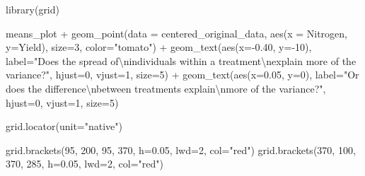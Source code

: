 \documentclass[
]{book}
\newenvironment{Shaded}{\begin{snugshade}}{\end{snugshade}}
\newcommand{\AttributeTok}[1]{\textcolor[rgb]{0.77,0.63,0.00}{#1}}
\newcommand{\DecValTok}[1]{\textcolor[rgb]{0.00,0.00,0.81}{#1}}
\newcommand{\FloatTok}[1]{\textcolor[rgb]{0.00,0.00,0.81}{#1}}
\newcommand{\FunctionTok}[1]{\textcolor[rgb]{0.00,0.00,0.00}{#1}}
\newcommand{\NormalTok}[1]{#1}
\newcommand{\SpecialCharTok}[1]{\textcolor[rgb]{0.00,0.00,0.00}{#1}}
\newcommand{\StringTok}[1]{\textcolor[rgb]{0.31,0.60,0.02}{#1}}
\begin{document}
\begin{Shaded}
\begin{Highlighting}[]
\FunctionTok{library}\NormalTok{(grid)}


\NormalTok{means\_plot }\SpecialCharTok{+} \FunctionTok{geom\_point}\NormalTok{(}\AttributeTok{data =}\NormalTok{ centered\_original\_data, }\FunctionTok{aes}\NormalTok{(}\AttributeTok{x =}\NormalTok{ Nitrogen, }\AttributeTok{y=}\NormalTok{Yield), }\AttributeTok{size=}\DecValTok{3}\NormalTok{, }\AttributeTok{color=}\StringTok{"tomato"}\NormalTok{) }\SpecialCharTok{+} 
  \FunctionTok{geom\_text}\NormalTok{(}\FunctionTok{aes}\NormalTok{(}\AttributeTok{x=}\SpecialCharTok{{-}}\FloatTok{0.40}\NormalTok{, }\AttributeTok{y=}\SpecialCharTok{{-}}\DecValTok{10}\NormalTok{), }\AttributeTok{label=}\StringTok{"Does the spread of}\SpecialCharTok{\textbackslash{}n}\StringTok{individuals within a treatment}\SpecialCharTok{\textbackslash{}n}\StringTok{explain more of the variance?"}\NormalTok{, }
            \AttributeTok{hjust=}\DecValTok{0}\NormalTok{, }\AttributeTok{vjust=}\DecValTok{1}\NormalTok{, }\AttributeTok{size=}\DecValTok{5}\NormalTok{) }\SpecialCharTok{+}
  \FunctionTok{geom\_text}\NormalTok{(}\FunctionTok{aes}\NormalTok{(}\AttributeTok{x=}\FloatTok{0.05}\NormalTok{, }\AttributeTok{y=}\DecValTok{0}\NormalTok{), }\AttributeTok{label=}\StringTok{"Or does the difference}\SpecialCharTok{\textbackslash{}n}\StringTok{between treatments explain}\SpecialCharTok{\textbackslash{}n}\StringTok{more of the variance?"}\NormalTok{, }
            \AttributeTok{hjust=}\DecValTok{0}\NormalTok{, }\AttributeTok{vjust=}\DecValTok{1}\NormalTok{, }\AttributeTok{size=}\DecValTok{5}\NormalTok{) }
  

\FunctionTok{grid.locator}\NormalTok{(}\AttributeTok{unit=}\StringTok{"native"}\NormalTok{) }

\FunctionTok{grid.brackets}\NormalTok{(}\DecValTok{95}\NormalTok{, }\DecValTok{200}\NormalTok{, }\DecValTok{95}\NormalTok{, }\DecValTok{370}\NormalTok{, }\AttributeTok{h=}\FloatTok{0.05}\NormalTok{, }\AttributeTok{lwd=}\DecValTok{2}\NormalTok{, }\AttributeTok{col=}\StringTok{"red"}\NormalTok{)}
\FunctionTok{grid.brackets}\NormalTok{(}\DecValTok{370}\NormalTok{, }\DecValTok{100}\NormalTok{, }\DecValTok{370}\NormalTok{, }\DecValTok{285}\NormalTok{, }\AttributeTok{h=}\FloatTok{0.05}\NormalTok{, }\AttributeTok{lwd=}\DecValTok{2}\NormalTok{, }\AttributeTok{col=}\StringTok{"red"}\NormalTok{)}
\end{Highlighting}
\end{Shaded}
\end{document}
